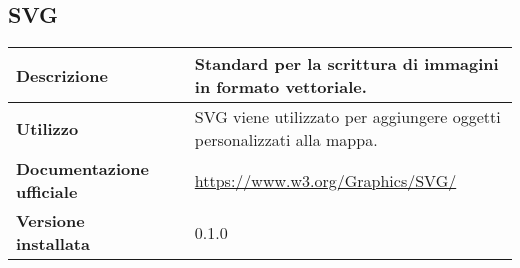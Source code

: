 \vspace{40px}
\subsection{SVG}
\label{SVG}
\begin{table}[H]
	\centering
	\begin{tabular}{p{2cm}p{0.5cm}p{11.5cm}}
		\arrayrulecolor{lightgray}
		\toprule
		\textbf{Descrizione} & &
		Standard per la scrittura di immagini in formato vettoriale.
		\\ \midrule
		\textbf{Utilizzo} & &
		SVG viene utilizzato per aggiungere oggetti personalizzati alla mappa.
		\\ \midrule
		\textbf{Documentazione ufficiale} & &
		\url{https://www.w3.org/Graphics/SVG/}
		\\ \midrule
		\textbf{Versione installata} & &
		0.1.0
		\\\bottomrule
	\end{tabular}
\end{table}